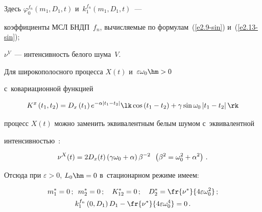Здесь $\varphi_0^{f_n} (m_1, D_1,t)$ и~$k_1^{f_n} (m_1, D_1,t)$~--- 

коэффициенты МСЛ БНДП~$f_n$, вы\-чис\-ляемые по формулам~(\ref{e2.9-sin}) и~(\ref{e2.13-sin}); 

$\nu^V$~--- интенсивность белого шума~$V$.



Для широкополосного процесса $X(t)$ и~$\varepsilon \omega_0\hm>0$ 

с~ковариационной функцией

      \begin{equation}

    K^x \left(t_1, t_2\right) = D_x \left(t_1\right) 

    e^{-\alpha\left\vert t_1-t_2\right\vert} \lk \cos \left(t_1- t_2\right) + 

    \gamma \sin \omega_0 \left\vert t_1- t_2\right\vert \rk

    \label{e7.4-sin}

    \end{equation}

процесс $X(t)$ можно заменить эквивалентным белым шумом с~эквивалентной 

интенсивностью~\cite{6-sin, 7-sin}:

     \begin{equation}

     \nu^X (t) = 2 D_x (t) \left(\gamma \omega_0 + \alpha\right)

    \beta^{-2} \enskip \left(\beta^2 = \omega_0^2 + \alpha^2\right)\,.

    \label{e7.5-sin}

    \end{equation}

Отсюда при $\varepsilon>0$, $L_0\hm=0$ в~стационарном режиме имеем:

   \begin{gather}

    m_1^* =0\,;\enskip 

    m_2^* =0\,; \quad 

    K_{12}^* =0\,;\quad 

    D_2^* =      \fr{\nu^*}{4\varepsilon \omega_0^2}\,;\label{e7.6-sin}

\\

    k_1^{f_n} \left(0, D_1\right) D_1 - \fr{\nu^*}{4\varepsilon \omega_0^4} =0\,.

    \label{e7.7-sin}

    \end{gather}



